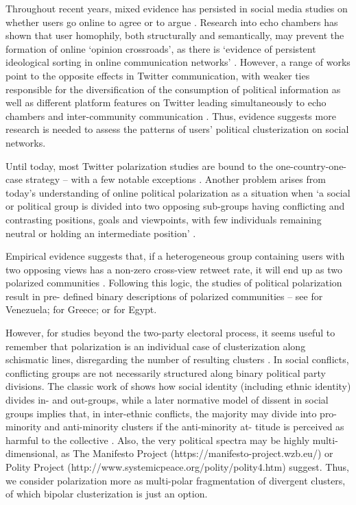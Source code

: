 Throughout recent years, mixed evidence has persisted in social media studies on whether users go online to agree or to argue \cite{YardiBoyd}. Research into echo chambers \cite{ColleoniRozzaArvidsson,Sunstein2002} has shown that user homophily, both structurally and semantically, may prevent the formation of online ‘opinion crossroads’, as there is ‘evidence of persistent ideological sorting in online communication networks’ \cite[p.~2]{Barbera}. However, a range of works point to the opposite effects in Twitter communication, with weaker ties responsible for the diversification of the consumption of political information \cite{Barbera} as well as different platform features on Twitter leading simultaneously to echo chambers and inter-community communication \cite{ConoverRatkiewiczFrancisco}. Thus, evidence suggests more research is needed to assess the patterns of users’ political clusterization on social networks.

Until today, most Twitter polarization studies are bound to the one-country-one-case strategy -- with a few notable exceptions \cite{Barbera,BarberaJostNagler}. Another problem arises from today’s understanding of online political polarization \cite{BramsonGrimSinger} as a situation when ‘a social or political group is divided into two opposing sub-groups having conflicting and contrasting positions, goals and viewpoints, with few individuals remaining neutral or holding an intermediate position’ \cite[p.~215]{CalaisGuerraMeiraJrCardie} \cite{Isenberg,Sunstein2002}.

Empirical evidence suggests that, if a heterogeneous group containing users with two opposing views has a non-zero cross-view retweet rate, it will end up as two polarized communities \cite{ConoverRatkiewiczFrancisco}. Following this logic, the studies of political polarization result in pre- defined binary descriptions of polarized communities -- see \cite{MoralesBorondoLosada} for Venezuela; 
\cite{AgathangelouKatakisRori} for Greece; or \cite{WeberGarimellaBatayneh} for Egypt.

However, for studies beyond the two-party electoral process, it seems useful to remember that polarization is an individual case of clusterization along schismatic lines, disregarding the number of resulting clusters \cite{EstebanRay}. In social conflicts, conflicting groups are not necessarily structured along binary political party divisions. The classic work of \cite{TajfelTurnerAustin} shows how social identity (including ethnic identity) divides in- and out-groups, while a later normative model of dissent in social groups \cite{Packer} implies that, in inter-ethnic conflicts, the majority may divide into pro- minority and anti-minority clusters if the anti-minority at- titude is perceived as harmful to the collective \cite[p.~5]{PackerChasteen}. Also, the very political spectra may be highly multi-dimensional, as The Manifesto Project (https://manifesto-project.wzb.eu/) or Polity Project (http://www.systemicpeace.org/polity/polity4.htm) suggest. Thus, we consider polarization more as multi-polar fragmentation of divergent clusters, of which bipolar clusterization is just an option.

